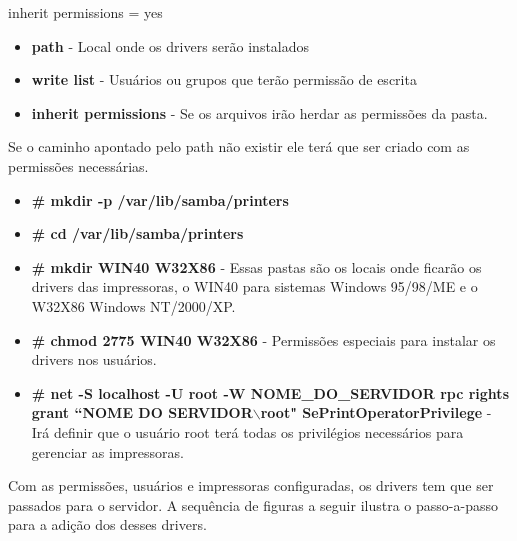 inherit permissions = yes

\begin{itemize}
	\item \textbf{path} - Local onde os drivers serão instalados
	\item \textbf{write list} - Usuários ou grupos que terão permissão de escrita
	\item \textbf{inherit permissions} - Se os arquivos irão herdar as permissões da pasta.
\end{itemize}

Se o caminho apontado pelo path não existir ele terá que ser criado com as permissões necessárias.

\begin{itemize}
	\item \textbf{\# mkdir -p /var/lib/samba/printers}
	
	\item \textbf{\# cd /var/lib/samba/printers}
	\item \textbf{\# mkdir WIN40 W32X86} - Essas pastas são os locais onde ficarão os drivers das impressoras, o WIN40 para sistemas Windows 95/98/ME e o W32X86 Windows NT/2000/XP.
	\item \textbf{\# chmod 2775 WIN40 W32X86} - Permissões especiais para instalar os drivers nos usuários.
	\item \textbf{\# net -S localhost -U root -W NOME\_DO\_SERVIDOR  rpc rights grant ``NOME DO SERVIDOR$\backslash$root" SePrintOperatorPrivilege} - Irá definir que o usuário root terá todas os privilégios necessários para gerenciar as impressoras.
\end{itemize}

Com as permissões, usuários e impressoras configuradas, os drivers tem que ser passados para o servidor. A sequência de figuras a seguir ilustra o passo-a-passo para a adição dos desses drivers.

